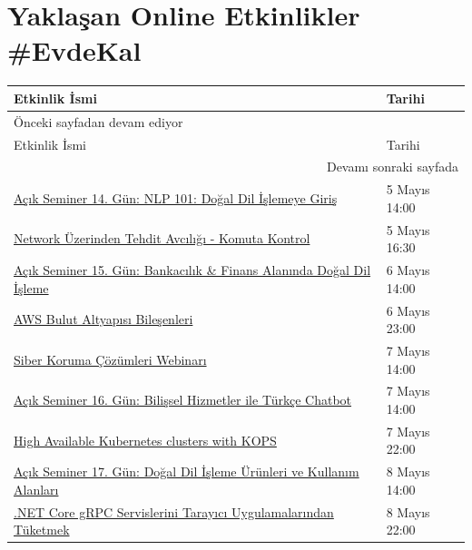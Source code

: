 \documentclass[11pt]{article}
\begin{document}
\section{Yaklaşan Online Etkinlikler \#EvdeKal}
\label{sec:org47e30e1}
\begin{longtable}{|p{9.5cm}|l|}
\hline
Etkinlik İsmi & Tarihi\\
\hline
\endfirsthead
\multicolumn{2}{l}{Önceki sayfadan devam ediyor} \\
\hline

Etkinlik İsmi & Tarihi \\

\hline
\endhead
\hline\multicolumn{2}{r}{Devamı sonraki sayfada} \\
\endfoot
\endlastfoot
\hline
\href{https://kommunity.com/tracikkaynak/events/acik-seminer-14-gun-nlp-101-dogal-dil-islemeye-giris-7194f676}{Açık Seminer 14. Gün: NLP 101: Doğal Dil İşlemeye Giriş} & 5 Mayıs 14:00\\
\href{https://kommunity.com/akademi/events/network-uzerinden-tehdit-avciligi-komuta-kontrol-baglantisinin-tespiti-f6ca2346}{Network Üzerinden Tehdit Avcılığı - Komuta Kontrol} & 5 Mayıs 16:30\\
\href{https://kommunity.com/tracikkaynak/events/acik-seminer-15-gun-bankacilik-finans-alaninda-dogal-dil-isleme-d9e0d4a5}{Açık Seminer 15. Gün: Bankacılık \& Finans Alanında Doğal Dil İşleme} & 6 Mayıs 14:00\\
\href{https://kommunity.com/cloud-and-serverless-turkey/events/ramazan-ozel-4-aws-bulut-altyapisi-bilesenleri-8fe02b6e}{AWS Bulut Altyapısı Bileşenleri} & 6 Mayıs 23:00\\
\href{https://kommunity.com/cozumpark/events/siber-koruma-cozumleri-webinari-4effd358}{Siber Koruma Çözümleri Webinarı} & 7 Mayıs 14:00\\
\href{https://kommunity.com/tracikkaynak/events/acik-seminer-16-gun-bilissel-hizmetler-ile-turkce-chatbot-olusturma-df205099}{Açık Seminer 16. Gün: Bilişsel Hizmetler ile Türkçe Chatbot} & 7 Mayıs 14:00\\
\href{https://kommunity.com/devops-turkiye/events/high-available-kubernetes-clusters-with-kops-e2728634}{High Available Kubernetes clusters with KOPS} & 7 Mayıs 22:00\\
\href{https://kommunity.com/tracikkaynak/events/acik-seminer-17-gun-dogal-dil-isleme-urunleri-ve-kullanim-alanlari-c9c008c2}{Açık Seminer 17. Gün: Doğal Dil İşleme Ürünleri ve Kullanım Alanları} & 8 Mayıs 14:00\\
\href{https://kommunity.com/dotnet-istanbul/events/net-core-grpc-servislerini-tarayici-uygulamalarindan-tuketmek-16e940d0}{.NET Core gRPC Servislerini Tarayıcı Uygulamalarından Tüketmek} & 8 Mayıs 22:00\\

\end{longtable}
\end{document}
